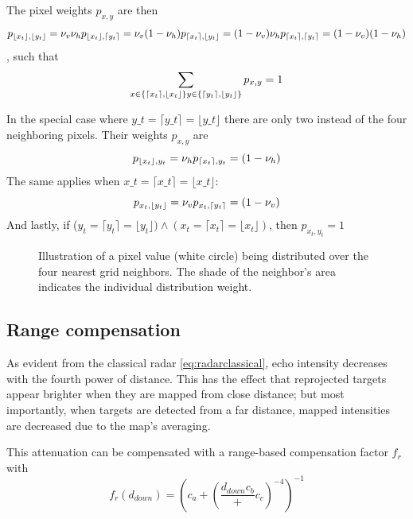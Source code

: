 The pixel weights \(p_{x,y}\) are then \[
p_{\lfloor x_t \rfloor, \lfloor y_t \rfloor} = \nu_v \nu_h\\
p_{\lfloor x_t \rfloor, \lceil y_t \rceil} = \nu_v (1 - \nu_h)\\
p_{\lceil x_t \rceil, \lfloor y_t \rfloor} =  (1 - \nu_v) \nu_h\\
p_{\lceil x_t \rceil, \lceil y_t \rceil} = (1 - \nu_v) (1 - \nu_h)
\] , such that \[
\sum\limits_{
x \in \{\lceil x_t \rceil, \lfloor x_t \rfloor\}\\
y \in \{\lceil y_t \rceil, \lfloor y_t \rfloor\}
} p_{x,y} = 1
\]

In the special case where $y\_t = \lceil y\_t \rceil = \lfloor y\_t\rfloor$ there are only two instead of the four neighboring pixels. Their weights \(p_{x,y}\) are \[
p_{\lfloor x_t \rfloor, y_t} = \nu_h\\
p_{\lceil x_t \rceil, y_t} = (1 - \nu_h)
\] The same applies when $x\_t = \lceil x\_t \rceil = \lfloor x\_t\rfloor$: \[
p_{x_t, \lfloor y_t \rfloor} = \nu_v\\
p_{x_t, \lceil y_t \rceil} = (1 - \nu_v)
\] And lastly, if
(\(y_t = \lceil y_t \rceil = \lfloor y_t \rfloor ) \land (x_t = \lceil x_t \rceil = \lfloor x_t \rfloor )\),
then \(p_{x_t, y_t} = 1\)

\begin{figure}[htbp]
    \centering
    \def\svgwidth{10cm}
    
    \caption{Illustration of a pixel value (white circle) being distributed over the four nearest grid neighbors. The shade of the neighbor's area indicates the individual distribution weight.}
    \label{fig:Sample_splitting}
\end{figure}

\subsection{Range compensation}\label{range-compensation}

As evident from the classical radar \cref{eq:radarclassical}, echo intensity decreases with
the fourth power of distance. This has the effect that reprojected
targets appear brighter when they are mapped from close distance; but
most importantly, when targets are detected from a far distance, mapped
intensities are decreased due to the map's averaging.

This attenuation can be compensated with a range-based compensation
factor \(f_r\) with \[f_r(d_{down}) = {
\left(
c_a + (
\frac{{d_{down}}{c_b}}
+ c_c)^{-4}
\right) ^ {-1}
}\]


